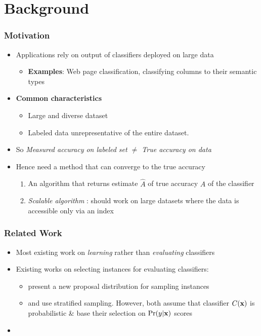 \documentclass[11pt]{beamer}
\newcommand{\vek}[1]{{\bf {#1}}}
\newcommand{\vx}{{\vek{x}}}
\newcommand{\TP}{{A}}
\newcommand{\estPerf}{{\hat{A}}}
\newlength{\wideitemsep}
\let\olditem\item
\renewcommand{\item}{\setlength{\itemsep}{\wideitemsep}\olditem}
\begin{document}
\section{Background}
\begin{frame}
\frametitle{Motivation}
\begin{itemize}
\item Applications rely on output of classifiers deployed on large data \\ 
\begin{itemize}
\item \textbf{Examples}: Web page classification, classifying columns to their semantic types
\end{itemize}
\item \textbf{Common characteristics} 
\begin{itemize}
\item Large and diverse dataset 
\item Labeled data unrepresentative of the entire dataset. 
\end{itemize}
\item So \textit{Measured accuracy on labeled set $\neq$ True accuracy on data}
\item Hence need a method that can converge to the true accuracy
\begin{enumerate}
\item An algorithm that returns estimate $\estPerf$ of true accuracy $\TP$ of the classifier
\item \textit{Scalable algorithm} : should work on large datasets where the data is accessible only via an index
\end{enumerate} 
\end{itemize}
\end{frame}

\begin{frame}
\frametitle{Related Work}
\begin{itemize}
\item Most existing work on \textit{learning} rather than \textit{evaluating} classifiers
\item Existing works on selecting instances for evaluating classifiers:
\begin{itemize}
\item \citep{sawade10} present a new proposal distribution for sampling instances
\item \citep{bennett10} and \citep{druck11} use stratified sampling. However, both assume that classifier $C(\vx)$ is probabilistic \& base their selection on $\Pr(y|\vx)$ scores
\end{itemize}
\item 
\end{itemize}
\end{frame}
\end{document}
